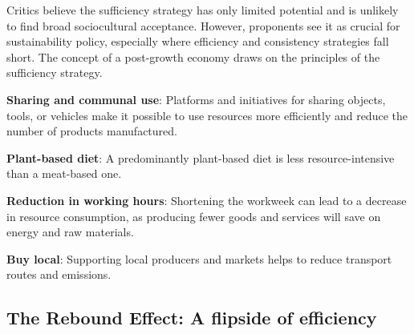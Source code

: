 \documentclass[
  a4paper,
  DIV=11,
  numbers=noendperiod,
  oneside,
  openany]{scrreprt}
\begin{document}
Critics believe the sufficiency strategy has only limited potential and
is unlikely to find broad sociocultural acceptance. However, proponents
see it as crucial for sustainability policy, especially where efficiency
and consistency strategies fall short. The concept of a post-growth
economy draws on the principles of the sufficiency strategy.

\begin{tcolorbox}[enhanced jigsaw, arc=.35mm, bottomrule=.15mm, bottomtitle=1mm, breakable, colback=white, colbacktitle=quarto-callout-tip-color!10!white, colframe=quarto-callout-tip-color-frame, coltitle=black, left=2mm, leftrule=.75mm, opacityback=0, opacitybacktitle=0.6, rightrule=.15mm, title={Putting Sufficiency Strategies into Action: Examples}, titlerule=0mm, toprule=.15mm, toptitle=1mm]

\textbf{Sharing and communal use}: Platforms and initiatives for sharing
objects, tools, or vehicles make it possible to use resources more
efficiently and reduce the number of products manufactured.

\textbf{Plant-based diet}: A predominantly plant-based diet is less
resource-intensive than a meat-based one.

\textbf{Reduction in working hours}: Shortening the workweek can lead to
a decrease in resource consumption, as producing fewer goods and
services will save on energy and raw materials.

\textbf{Buy local}: Supporting local producers and markets helps to
reduce transport routes and emissions.

\end{tcolorbox}

\subsection{The Rebound Effect: A flipside of
efficiency}\label{the-rebound-effect-a-flipside-of-efficiency}
\end{document}

